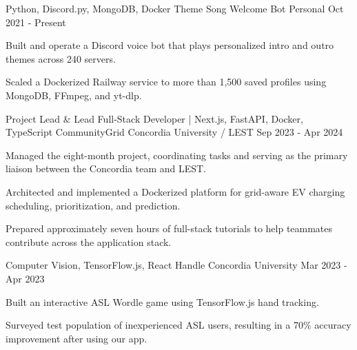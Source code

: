

\begin{cventries}
  \cventry
    {Python, Discord.py, MongoDB, Docker} %
    {Theme Song Welcome Bot} %
    {Personal} %
    {Oct 2021 - Present} %
    {
      \begin{cvitems} %
        \item {Built and operate a Discord voice bot that plays personalized intro and outro themes across 240 servers.}
        \item {Scaled a Dockerized Railway service to more than 1,500 saved profiles using MongoDB, FFmpeg, and yt-dlp.}
      \end{cvitems}
    }

  \cventry
    {Project Lead \& Lead Full-Stack Developer | Next.js, FastAPI, Docker, TypeScript} %
    {CommunityGrid} %
    {Concordia University / LEST} %
    {Sep 2023 - Apr 2024} %
    {
      \begin{cvitems} %
        \item {Managed the eight-month project, coordinating tasks and serving as the primary liaison between the Concordia team and LEST.}
        \item {Architected and implemented a Dockerized platform for grid-aware EV charging scheduling, prioritization, and prediction.}
        \item {Prepared approximately seven hours of full-stack tutorials to help teammates contribute across the application stack.}
      \end{cvitems}
    }

  \cventry
    {Computer Vision, TensorFlow.js, React} %
    {Handle} %
    {Concordia University} %
    {Mar 2023 - Apr 2023} %
    {
      \begin{cvitems} %
        \item {Built an interactive ASL Wordle game using TensorFlow.js hand tracking.}
        \item {Surveyed test population of inexperienced ASL users, resulting in a 70\% accuracy improvement after using our app.}
      \end{cvitems}
    }


\end{cventries}
